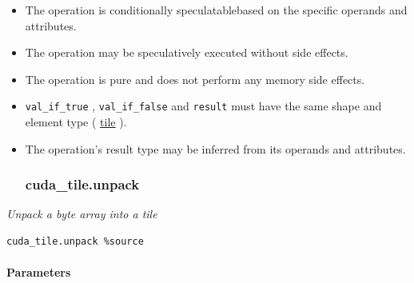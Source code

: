 \documentclass{article}
\begin{document}
\begin{itemize}
\item The operation is conditionally speculatablebased on the specific operands and attributes.
\item The operation may be speculatively executed without side effects.
\item The operation is pure and does not perform any memory side effects.
\item \texttt{val\_if\_true} , \texttt{val\_if\_false} and \texttt{result} must have the same shape and element type ( \href{https://docs.nvidia.com/cuda/tile-ir/latest/sections/types.html#type-tile}{tile} ).
\item The operation's result type may be inferred from its operands and attributes.


\subsubsection{cuda\_tile.unpack}

\end{itemize}
\textit{Unpack a byte array into a tile}


\begin{lstlisting}
cuda_tile.unpack %source
\end{lstlisting}

\paragraph{Parameters}
\end{document}
